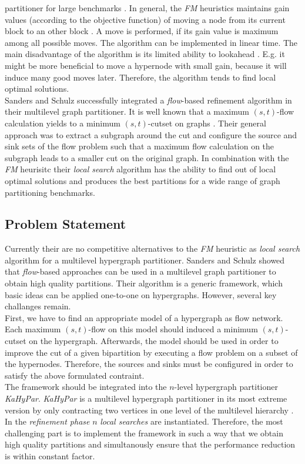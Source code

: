partitioner for large benchmarks \cite{papa2007hypergraph}. In general, the \emph{FM}
heuristics maintains gain values (according to the objective function) of moving a node
from its current block to an other block \cite{fiduccia1988linear}. A move is performed, 
if its gain value is maximum among all possible moves. The algorithm can be implemented 
in linear time. The main disadvantage of the algorithm is its limited ability to lookahead
\cite{zhao2002effective}. E.g. it might be more beneficial to move a hypernode with 
small gain, because it will induce many good moves later. Therefore, the algorithm
tends to find local optimal solutions. \\ 
Sanders and Schulz \cite{sanders2011engineering} successfully integrated a \emph{flow}-based refinement
algorithm in their multilevel graph partitioner. It is well known that a maximum $(s,t)$-flow
calculation yields to a minimum $(s,t)$-cutset on graphs \cite{ford1956maximal}. Their general
approach was to extract a subgraph around the cut and configure the source and sink sets
of the flow problem such that a maximum flow calculation on the subgraph leads to a 
smaller cut on the original graph. In combination with the \emph{FM} heurisitc their \emph{local
search} algorithm has the ability to find out of local optimal solutions and produces
the best partitions for a wide range of graph partitioning benchmarks.

\subsection{Problem Statement}

Currently their are no competitive alternatives to the \emph{FM} heuristic as \emph{local search}
algorithm for a multilevel hypergraph partitioner. Sanders and Schulz \cite{sanders2011engineering}
showed that \emph{flow}-based approaches can be used in a multilevel graph partitioner to obtain
high quality partitions. Their algorithm is a generic framework, which basic ideas can be
applied one-to-one on hypergraphs. However, several key challanges remain.\\
First, we have to find an appropriate model of a hypergraph as flow network. Each maximum
$(s,t)$-flow on this model should induced a minimum $(s,t)$-cutset on the hypergraph.
Afterwards, the model should be used in order to improve the cut of a given bipartition by
executing a flow problem on a subset of the hypernodes. Therefore, the 
sources and sinks must be configured in order to satisfy the above formulated contraint. \\
The framework should be integrated into the $n$-level hypergraph partitioner 
\emph{KaHyPar}. \emph{KaHyPar} is a multilevel hypergraph partitioner in its most extreme 
version by only contracting two vertices in one level of the multilevel hierarchy
\cite{akhremtsev2017engineering,heuer2017improving,schlag2016k}. In the \emph{refinement 
phase} $n$ \emph{local searches} are instantiated. Therefore, the most challenging part is
to implement the framework in such a way that we obtain
high quality partitions and simultanously ensure that the performance reduction is within
constant factor.


